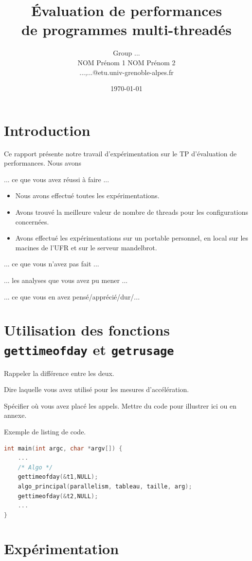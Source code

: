 \documentclass[11pt]{article}
\title{\'Evaluation de performances\\ de programmes multi-threadés}
\author{{\Large Group ...}\\
\quad NOM Prénom 1 \quad NOM Prénom 2 \\{...,...}@etu.univ-grenoble-alpes.fr}
\date{\today{}}
\begin{document}
\maketitle

\section*{Introduction}
%
Ce rapport présente notre travail d'expérimentation sur le TP d'évaluation de performances. Nous avons 

... ce que vous avez réussi à faire ...

\begin{itemize}
\item
  Nous avons effectué toutes les expérimentations.
\item
  Avons trouvé la meilleure valeur de nombre de threads pour les configurations concernées. 
\item
  Avons effectué les expérimentations sur un portable personnel, en local sur les macines de l'UFR et sur le serveur mandelbrot. 
\end{itemize}

... ce que vous n'avez pas fait ...


... les analyses que vous avez pu mener ...

... ce que vous en avez pensé/apprécié/dur/...
%


\section{Utilisation des fonctions \texttt{gettimeofday} et \texttt{getrusage}}

Rappeler la différence entre les deux.

Dire laquelle vous avez utilisé pour les mesures d'accélération.

Spécifier où vous avez placé les appels. Mettre du code pour illustrer ici ou en annexe.

Exemple de listing de code.
\begin{lstlisting}[language=C]
int main(int argc, char *argv[]) {
    ...
    /* Algo */
	gettimeofday(&t1,NULL);    
    algo_principal(parallelism, tableau, taille, arg);
    gettimeofday(&t2,NULL);
    ...
}    
\end{lstlisting}

\section{Expérimentation}
\end{document}
